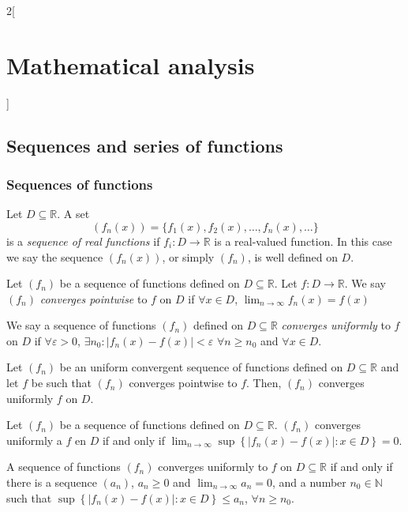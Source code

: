 \documentclass[class=article,crop=false]{standalone}
\begin{document}
\begin{multicols}{2}[\section{Mathematical analysis}]
\subsection{Sequences and series of functions}
\subsubsection{Sequences of functions}
\begin{definition}
Let $D\subseteq\mathbb{R}$. A set $$(f_n(x))=\{f_1(x),f_2(x),\ldots,f_n(x),\ldots\}$$ is a \textit{sequence of real functions} if $f_i:D\rightarrow\mathbb{R}$ is a real-valued function. In this case we say the sequence $(f_n(x))$, or simply $(f_n)$, is well defined on $D$.
\end{definition}
\begin{definition}
Let $(f_n)$ be a sequence of functions defined on $D\subseteq\mathbb{R}$. Let $f:D\rightarrow\mathbb{R}$. We say $(f_n)$ \textit{converges pointwise} to $f$ on $D$ if $\forall x\in D$, $\displaystyle\lim_{n\to\infty}f_n(x)=f(x)$
\end{definition}
\begin{definition}
We say a sequence of functions $(f_n)$ defined on $D\subseteq\mathbb{R}$ \textit{converges uniformly} to $f$ on $D$ if $\forall\varepsilon>0$, $\exists n_0:|f_n(x)-f(x)|<\varepsilon$ $\forall n\geq n_0$ and $\forall x\in D$.
\end{definition}
\begin{lemma}
Let $(f_n)$ be an uniform convergent sequence of functions defined on $D\subseteq\mathbb{R}$ and let $f$ be such that $(f_n)$ converges pointwise to $f$. Then, $(f_n)$ converges uniformly $f$ on $D$.
\end{lemma}
\begin{lemma}
Let $(f_n)$ be a sequence of functions defined on $D\subseteq\mathbb{R}$. $(f_n)$ converges uniformly a $f$ en $\displaystyle D$ if and only if $\lim_{n\to\infty}\sup\left\{|f_n(x)-f(x)|:x\in D\right\}=0$.
\end{lemma}
\begin{corollary}
A sequence of functions $(f_n)$ converges uniformly to $f$ on $D\subseteq\mathbb{R}$ if and only if there is a sequence $(a_n)$, $a_n\geq 0$ and $\displaystyle \lim_{n\to\infty} a_n=0$, and a number $\displaystyle n_0\in\mathbb{N}$ such that $\sup\left\{|f_n(x)-f(x)|: x\in D\right\}\leq a_n$, $\forall n\geq n_0$.
\end{corollary}
\begin{theorem}

\end{theorem}
\end{multicols}
\end{document}

